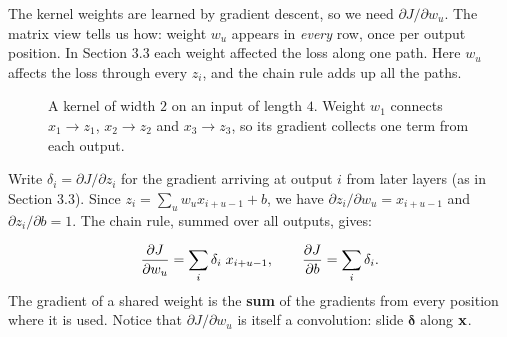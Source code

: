 \documentclass[12pt, a4paper]{article}
\providecommand{\bdelta}{\boldsymbol{\delta}}
\begin{document}
The kernel weights are learned by gradient descent, so we need
$\partial J / \partial w_u$. The matrix view tells us how: weight $w_u$
appears in \emph{every} row, once per output position. In Section 3.3 each
weight affected the loss along one path. Here $w_u$ affects the loss through
every $z_i$, and the chain rule adds up all the paths.

\begin{figure}[H]
  \centering
  \caption{A kernel of width $2$ on an input of length $4$. Weight $w_1$
    connects $x_1 \to z_1$, $x_2 \to z_2$ and $x_3 \to z_3$, so its gradient
    collects one term from each output.}
  \label{fig:backprop}
\end{figure}

Write $\delta_i = \partial J / \partial z_i$ for the gradient arriving at
output $i$ from later layers (as in Section 3.3). Since
$z_i = \sum_u w_u x_{i+u-1} + b$, we have
$\partial z_i / \partial w_u = x_{i+u-1}$ and $\partial z_i / \partial b = 1$.
The chain rule, summed over all outputs, gives:

\begin{resultbox}
  \[
    \dfrac{\partial J}{\partial w_u} = \sum_{i} \delta_i\; x_{i+u-1},
    \qquad
    \dfrac{\partial J}{\partial b} = \sum_{i} \delta_i .
  \]
  The gradient of a shared weight is the \textbf{sum} of the gradients from
  every position where it is used. Notice that
  $\partial J / \partial w_u$ is itself a convolution: slide $\bdelta$ along
  $\mathbf{x}$.
\end{resultbox}
\end{document}
